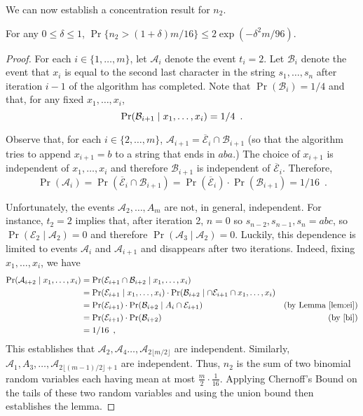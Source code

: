 \documentclass{patmorin}
\newcommand{\floor}[1]{\lfloor #1\rfloor}
\begin{document}
We can now establish a concentration result for $n_2$.

\begin{lem}
  For any $0\le\delta\le 1$, $\Pr\{n_2 > (1+\delta)m/16\} \le 2\exp(-\delta^2 m/96)$.
\end{lem}

\begin{proof}
  For each $i\in\{1,\ldots,m\}$, let $\mathcal{A}_i$ denote the event $t_{i}=2$.  Let $\mathcal{B}_i$ denote the event that $x_i$ is equal to the second last character in the string $s_1,\ldots,s_n$ after iteration $i-1$ of the algorithm has completed.  Note that $\Pr(\mathcal{B}_i)=1/4$ and that, for any fixed $x_1,\ldots,x_i$,
  \begin{equation} 
    \Pr(\mathcal{B}_{i+1}\mid x_1,\ldots,x_i) = 1/4 \enspace . \eqlabel{bi} 
  \end{equation}
  
  Observe that, for each $i\in\{2,\ldots,m\}$, $\mathcal{A}_{i+1}=\overline{\mathcal{E}}_i\cap \mathcal{B}_{i+1}$ (so that the algorithm tries to append $x_{i+1}=b$ to a string that ends in $aba$.) The choice of $x_{i+1}$ is independent of $x_1,\ldots,x_{i}$ and therefore $\mathcal{B}_{i+1}$ is independent of $\overline{\mathcal{E}}_i$.  Therefore,
  \[  \Pr(\mathcal{A}_i) = \Pr(\overline{\mathcal{E}}_i\cap \mathcal{B}_{i+1}) = \Pr(\overline{\mathcal{E}}_i)\cdot\Pr(\mathcal{B}_{i+1}) = 1/16 \enspace .
  \]
  
  Unfortunately, the events $\mathcal{A}_2,\ldots,A_m$ are not, in general, independent.  For instance, $t_2=2$ implies that, after iteration 2, $n=0$ so $s_{n-2},s_{n-1},s_n=abc$, so $\Pr(\mathcal{E}_2\mid \mathcal{A}_2)=0$ and therefore $\Pr(\mathcal{A}_3\mid \mathcal{A}_2)=0$.  Luckily, this dependence is limited to events $\mathcal{A}_i$ and $\mathcal{A}_{i+1}$ and disappears after two iterations.  Indeed, fixing $x_1,\ldots,x_i$, we have
  \begin{align*}
     \Pr(\mathcal{A}_{i+2}\mid x_1,\ldots,x_i) 
     & = \Pr(\mathcal{E}_{i+1}\cap \mathcal{B}_{i+2}\mid x_1,\ldots,x_i) \\
     & = \Pr(\mathcal{E}_{i+1}\mid x_1,\ldots,x_i)\cdot \Pr(\mathcal{B}_{i+2}\mid \cap\mathcal{E}_{i+1}\cap x_1,\ldots,x_i) \\
     & = \Pr(\mathcal{E}_{i+1})\cdot \Pr(\mathcal{B}_{i+2}\mid A_i\cap\mathcal{E}_{i+1}) & \text{(by \lemref{ei})}\\
     & = \Pr(\mathcal{E}_{i+1})\cdot \Pr(\mathcal{B}_{i+2})
       &\text{(by \eqref{bi})} \\
     & = 1/16 \enspace ,
  \end{align*}  
  This establishes that $\mathcal{A}_{2},\mathcal{A}_{4}\ldots,\mathcal{A}_{2\floor{m/2}}$ are independent. Similarly,   $\mathcal{A}_{1},A_{3},\ldots,\mathcal{A}_{2\floor{(m-1)/2}+1}$ are independent.  Thus, $n_2$ is the sum of two binomial random variables each having mean at most $\tfrac{m}{2}\cdot\tfrac{1}{16}$.  Applying Chernoff's Bound on the tails of these two random variables and using the union bound then establishes the lemma.
\end{proof}
\end{document}
